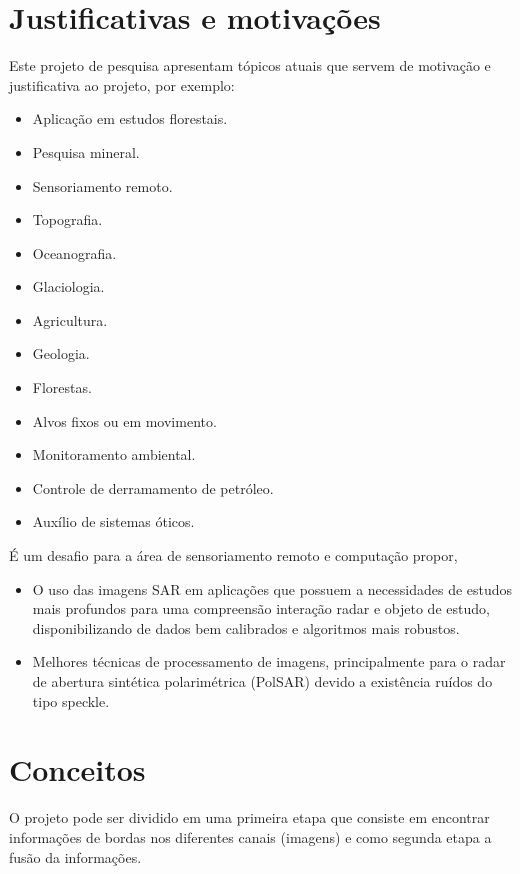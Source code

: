 \documentclass[runningheads]{llncs}
\begin{document}
\section{Justificativas e motivações}
Este projeto de pesquisa apresentam tópicos atuais que servem de motivação e justificativa ao projeto, por exemplo:
\begin{itemize}
\item Aplicação em estudos florestais.
\item Pesquisa mineral.
\item Sensoriamento remoto.
\item Topografia.
\item Oceanografia.
\item Glaciologia.
\item Agricultura.
\item Geologia.
\item Florestas.
\item Alvos fixos ou em movimento.
\item Monitoramento ambiental.
\item Controle de derramamento de petróleo.
\item Auxílio de sistemas óticos.
\end{itemize}

É um desafio para a área de sensoriamento remoto e computação propor,
\begin{itemize}
\item O uso das imagens SAR em aplicações que possuem a necessidades de estudos mais profundos para uma compreensão interação radar e objeto de estudo, disponibilizando de dados bem calibrados e algoritmos mais robustos.
  \item Melhores técnicas de processamento de imagens, principalmente para o radar de abertura sintética polarimétrica (PolSAR) devido a existência ruídos do tipo speckle.
\end{itemize}
\section{Conceitos}
O projeto pode ser dividido em uma primeira etapa que consiste em encontrar informações de bordas nos diferentes canais (imagens) e como segunda etapa a fusão da informações. 
\end{document}
